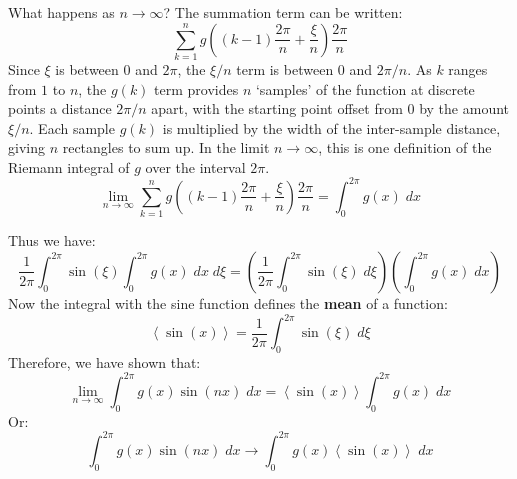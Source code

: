 \documentclass[a4paper]{report}
\begin{document}
What happens as $n \to \infty$?  The summation term can be written:
\begin{equation}
\sum_{k=1}^n g\left((k-1)\frac{ 2\pi}{n} + \frac{\xi}{n} \right) \frac{2\pi}{n}
 \end{equation}
Since $\xi$ is between $0$ and $2\pi$, the $\xi/n$ term is between $0$ and $2\pi/n$.
As $k$ ranges from $1$ to $n$, the $g(k)$ term provides $n$ `samples' of the function at discrete points a distance $2\pi/n$ apart, with the starting point offset from $0$ by the amount $\xi/n$.  Each sample $g(k)$ is multiplied by the width of the inter-sample distance, giving $n$ rectangles to sum up.   In the limit $n \to \infty$, this is one definition of the Riemann integral of $g$ over the interval $2\pi$.
\begin{equation}
\lim_{n \to \infty} \sum_{k=1}^n g\left((k-1)\frac{ 2\pi}{n} + \frac{\xi}{n} \right) \frac{2\pi}{n} = \int_0^{2\pi} g(x) \;dx
 \end{equation}

\begin{center}
\end{center}


Thus we have:
\begin{equation}
\frac{1}{2\pi} \int_0^{2\pi} \sin(\xi)
\int_0^{2\pi} g(x) \;dx \;d\xi
= 
\left( \frac{1}{2\pi} \int_0^{2\pi} \sin(\xi) \;d\xi \right)
\left( \int_0^{2\pi} g(x) \;dx \right)
 \end{equation}
Now the integral with the sine function defines the \textbf{mean} of a function:
\begin{equation}
\left< \sin(x) \right> = \frac{1}{2\pi} \int_0^{2\pi} \sin(\xi) \;d\xi
\end{equation}
Therefore, we have shown that:
\begin{equation}
\lim_{n \to \infty} \int_0^{2\pi} g(x) \sin(nx) \;dx = \left< \sin(x) \right>
 \int_0^{2\pi} g(x) \;dx
\end{equation}
Or:
\begin{equation}
\int_0^{2\pi} g(x) \sin(nx) \;dx  \to  
 \int_0^{2\pi} g(x) \left< \sin(x) \right> \;dx
\end{equation}
\end{document}
